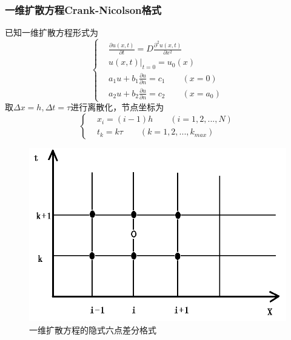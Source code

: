 \documentclass[twoside,twocolumn]{article}
\begin{document}
\begin{CJK*}{UTF8}{gkai}
\subsubsection{一维扩散方程Crank-Nicolson格式}
已知一维扩散方程形式为
\begin{equation*}
\left\{
\begin{aligned}
&\frac{\partial u(x,t)}{\partial t}=D\frac{\partial^{2}u(x,t)}{\partial x^{2}}\\
&\left.u(x,t)\right|_{t=0}=u_{0}(x)\\
&a_{1}u+b_{1}\frac{\partial u}{\partial n}=c_{1}\qquad (x=0)\\
&a_{2}u+b_{2}\frac{\partial u}{\partial n}=c_{2}\qquad (x=a_{0})
\end{aligned}
\right.
\end{equation*}
取$\Delta x=h,\Delta t=\tau$进行离散化，节点坐标为
\begin{equation*}
\left\{
\begin{aligned}
&x_{i}=(i-1)h\qquad (i=1,2,...,N)\\
&t_{k}=k\tau\qquad (k=1,2,...,k_{max})
\end{aligned}
\right.
\end{equation*}
\begin{figure}[h]
	\centering
	\includegraphics[width=1.0\linewidth]{figure/fig1}
	\caption{一维扩散方程的隐式六点差分格式}
	\label{fig:fig1}
\end{figure}


\end{CJK*}
\end{document}
